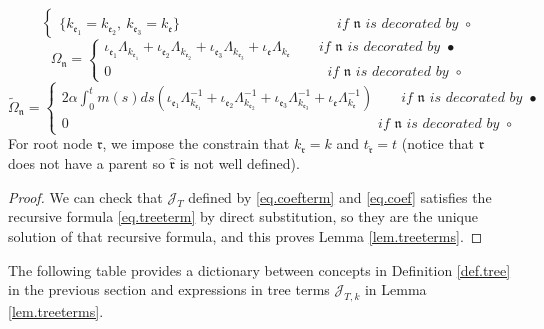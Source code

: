 \begin{lem}
\begin{equation}
\begin{cases}
 \\
 \{k_{\mathfrak{e}_1}=k_{\mathfrak{e}_2},\ k_{\mathfrak{e}_3}=k_{\mathfrak{e}}\} \qquad\qquad\qquad\qquad\qquad\quad\ \textit{if }\mathfrak{n}\textit{ is decorated by }\circ
 \end{cases}
\end{equation}
\begin{equation}
 \Omega_{\mathfrak{n}}=
 \begin{cases}
 \iota_{\mathfrak{e}_1}\Lambda_{k_{\mathfrak{e}_1}}+\iota_{\mathfrak{e}_2}\Lambda_{k_{\mathfrak{e}_2}}+\iota_{\mathfrak{e}_3}\Lambda_{k_{\mathfrak{e}_3}}+\iota_{\mathfrak{e}}\Lambda_{k_{\mathfrak{e}}} \qquad \textit{if }\mathfrak{n}\textit{ is decorated by }\bullet
 \\
 0 \qquad\qquad\qquad\qquad\qquad\qquad \qquad\quad\ \ \textit{if }\mathfrak{n}\textit{ is decorated by }\circ
 \end{cases}
\end{equation}
\begin{equation}
 \widetilde{\Omega}_{\mathfrak{n}}=
 \begin{cases}
 2\alpha \int^t_{0}m(s) ds\left(\iota_{\mathfrak{e}_1}\Lambda_{k_{\mathfrak{e}_1}}^{-1}+\iota_{\mathfrak{e}_2}\Lambda_{k_{\mathfrak{e}_2}}^{-1}+\iota_{\mathfrak{e}_3}\Lambda_{k_{\mathfrak{e}_3}}^{-1}+\iota_{\mathfrak{e}}\Lambda_{k_{\mathfrak{e}}}^{-1}\right) \qquad \textit{if }\mathfrak{n}\textit{ is decorated by }\bullet
 \\
 0 \qquad\qquad\qquad\qquad\qquad\qquad\qquad\qquad\qquad\qquad\quad\ \ \ \ \  \textit{if }\mathfrak{n}\textit{ is decorated by }\circ
 \end{cases}
\end{equation}
For root node $\mathfrak{r}$, we impose the constrain that $k_{\mathfrak{r}}=k$ and $t_{\widehat{\mathfrak{r}}}=t$ (notice that $\mathfrak{r}$ does not have a parent so $\widehat{\mathfrak{r}}$ is not well defined). 
\end{lem}


\begin{proof}
We can check that $\mathcal{J}_T$ defined by \eqref{eq.coefterm} and \eqref{eq.coef} satisfies the recursive formula \eqref{eq.treeterm} by direct substitution, so they are the unique solution of that recursive formula, and this proves Lemma \ref{lem.treeterms}.
\end{proof}


The following table provides a dictionary between concepts in Definition \ref{def.tree} in the previous section and expressions in tree terms $\mathcal{J}_{T,k}$ in Lemma \ref{lem.treeterms}.

